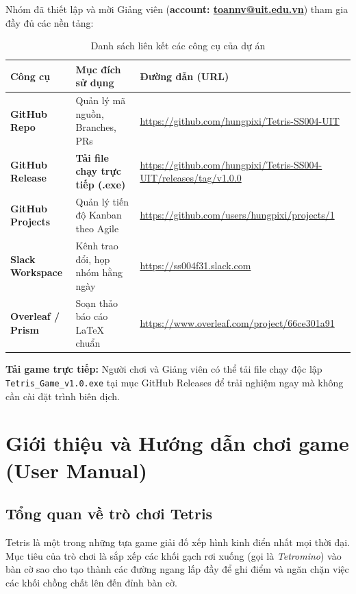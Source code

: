 \documentclass[12pt,a4paper]{article}
\begin{document}
Nhóm đã thiết lập và mời Giảng viên (\textbf{account: \href{mailto:toannv@uit.edu.vn}{toannv@uit.edu.vn}}) tham gia đầy đủ các nền tảng:

\begin{table}[h!]
\centering
\begin{tabularx}{\textwidth}{llX}
\toprule
\textbf{Công cụ} & \textbf{Mục đích sử dụng} & \textbf{Đường dẫn (URL)} \\
\midrule
\textbf{GitHub Repo} & Quản lý mã nguồn, Branches, PRs & \href{https://github.com/hungpixi/Tetris-SS004-UIT}{https://github.com/hungpixi/Tetris-SS004-UIT} \\
\textbf{GitHub Release} & \textbf{Tải file chạy trực tiếp (.exe)} & \href{https://github.com/hungpixi/Tetris-SS004-UIT/releases/tag/v1.0.0}{https://github.com/hungpixi/Tetris-SS004-UIT/releases/tag/v1.0.0} \\
\textbf{GitHub Projects} & Quản lý tiến độ Kanban theo Agile & \href{https://github.com/users/hungpixi/projects/1}{https://github.com/users/hungpixi/projects/1} \\
\textbf{Slack Workspace} & Kênh trao đổi, họp nhóm hằng ngày & \href{https://ss004f31.slack.com}{https://ss004f31.slack.com} \\
\textbf{Overleaf / Prism} & Soạn thảo báo cáo LaTeX chuẩn & \href{https://www.overleaf.com/project/66ce301a91}{https://www.overleaf.com/project/66ce301a91} \\
\bottomrule
\end{tabularx}
\caption{Danh sách liên kết các công cụ của dự án}
\end{table}

\begin{tcolorbox}[colback=green!5!white,colframe=green!60!black]
    \textbf{Tải game trực tiếp:} Người chơi và Giảng viên có thể tải file chạy độc lập \texttt{Tetris\_Game\_v1.0.exe} tại mục GitHub Releases để trải nghiệm ngay mà không cần cài đặt trình biên dịch.
\end{tcolorbox}

\newpage

\section{Giới thiệu và Hướng dẫn chơi game (User Manual)}

\subsection{Tổng quan về trò chơi Tetris}
Tetris là một trong những tựa game giải đố xếp hình kinh điển nhất mọi thời đại. Mục tiêu của trò chơi là sắp xếp các khối gạch rơi xuống (gọi là \textit{Tetromino}) vào bàn cờ sao cho tạo thành các đường ngang lấp đầy để ghi điểm và ngăn chặn việc các khối chồng chất lên đến đỉnh bàn cờ.
\end{document}
